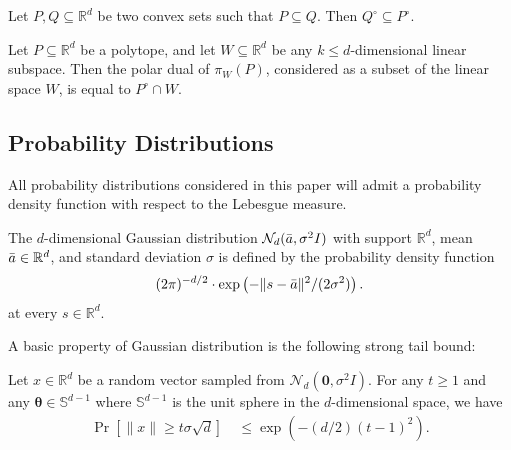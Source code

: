 \documentclass{theoretics}
\newcommand{\R}{\mathbb R}
\renewcommand{\subset}{\subseteq}
\begin{document}
\begin{fact}\label{fact:dual-containing}
    Let $P, Q \subset \R^d$ be two convex sets such that $P \subseteq Q$. Then $Q^\circ \subseteq P^\circ$.
\end{fact}

\begin{fact}\label{fact:dual-intersection}
    Let $P \subset \R^d$ be a polytope, and let $W \subset \R^d$ be any $k \leq d$-dimensional linear subspace. Then the polar dual of $\pi_W(P)$, considered as a subset of the linear space $W$, is equal to $P^\circ \cap W$.
\end{fact}


\subsection{Probability Distributions}\label{sec:laplace-gaussian}
All probability distributions considered in this paper will admit a probability density
function with respect to the Lebesgue measure.

\begin{definition}
    The $d$-dimensional Gaussian distribution $\mathcal{N}_d(\Bar{a}, \sigma^2I)$ with support $\R^d$, mean $\Bar{a}\in \R^d$, and standard deviation $\sigma$ is defined by the probability density function
    \begin{align*}
        (2\pi)^{-d/2} \cdot \exp\left(-\|s - \Bar{a}\|^2 / (2\sigma^2) \right).
    \end{align*}
    at every $s \in \R^d$.
\end{definition}

A basic property of Gaussian distribution is the following strong tail bound:
\begin{lemma}\label{lem:gaussian-tail}
    Let $x \in \R^d$ be a random vector sampled from $\mathcal{N}_d(\mathbf{0}, \sigma^2 I)$.
    For any $t\geq 1$ and any $\mathbf{\theta}\in \mathbb{S}^{d-1}$ where $\mathbb{S}^{d-1}$ is the unit sphere in the $d$-dimensional space, we have
        \begin{align*}
            \Pr[\|x\| \geq t\sigma \sqrt{d}] & ~ \leq \exp(-(d/2)(t-1)^2).
        \end{align*}
\end{lemma}
\end{document}
